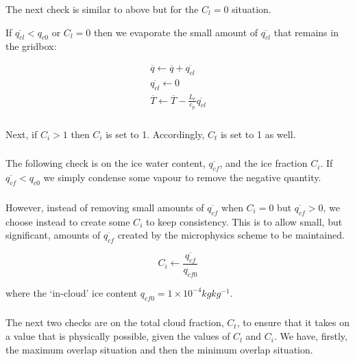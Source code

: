 \documentclass{UMDP_article}
\begin{document}
\subsubsection{} 
The next check is similar to above but for the $C_l = 0$ situation. 

If $\overline{q_{cl}} < q_{c0}$ or $C_l = 0$ then we evaporate the
small amount of $\overline{q_{cl}}$ that remains in the gridbox:

\begin{eqnarray}
\overline{q} \leftarrow \overline{q} + \overline{q_{cl}} \nonumber \\
\overline{q_{cl}} \leftarrow 0 \nonumber \\
\overline{T} \leftarrow \overline{T} - \frac{L_c}{c_p} \overline{q_{cl}}
\label{eq:qclcheck}
\end{eqnarray}

\subsubsection{} 
Next, if $C_i > 1$ then $C_i$ is set to 1. Accordingly, $C_t$ is set to
1 as well.

\subsubsection{} 
The following check is on the ice water content, $\overline{q_{cf}}$, and 
the ice fraction $C_i$. If $\overline{q_{cf}} < q_{c0}$ we simply condense some
vapour to remove the negative quantity.

\subsubsection{} 
However, instead of removing small amounts of 
$\overline{q_{cf}}$ when $C_i = 0$ but $\overline{q_{cf}} > 0$, we choose instead to create
some $C_i$ to keep consistency. This is to allow small, but significant,
amounts of $\overline{q_{cf}}$ created by the microphysics scheme to
be maintained.

\begin{equation}
C_i \leftarrow \frac { \overline{q_{cf}} }{q_{cf0}}
\label{eq:cf_reset}
\end{equation}

where the `in-cloud' ice content $q_{cf0} = 1 \times 10^{-4} kg kg^{-1}$.

\subsubsection{} 
The next two checks are on the total cloud fraction, $C_t$, to ensure
that it takes on a value that is physically possible, given the values
of $C_l$ and $C_i$. We have, firstly, the maximum overlap situation and
then the minimum overlap situation.
\end{document}
